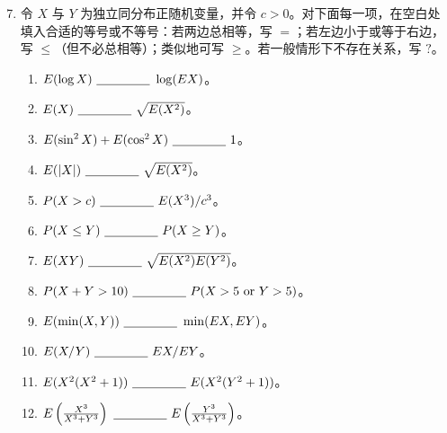 \documentclass[UTF8, 12pt, fontset=fandol, oneside]{ctexart}
\begin{document}
\begin{enumerate}
  \setcounter{enumi}{6}
  \item 令 $X$ 与 $Y$ 为独立同分布正随机变量，并令 $c>0$。对下面每一项，在空白处填入合适的等号或不等号：若两边总相等，写 $=$；若左边小于或等于右边，写 $\le$（但不必总相等）；类似地可写 $\ge$。若一般情形下不存在关系，写 $?$。
  \begin{enumerate}
    \item $E(\log X)\ \underline{\hspace{1.5cm}}\ \log(EX)$。
    \item $E(X)\ \underline{\hspace{1.5cm}}\ \sqrt{E(X^2)}$。
    \item $E(\sin^2 X)+E(\cos^2 X)\ \underline{\hspace{1.5cm}}\ 1$。
    \item $E(|X|)\ \underline{\hspace{1.5cm}}\ \sqrt{E(X^2)}$。
    \item $P(X>c)\ \underline{\hspace{1.5cm}}\ E(X^3)/c^3$。
    \item $P(X\le Y)\ \underline{\hspace{1.5cm}}\ P(X\ge Y)$。
    \item $E(XY)\ \underline{\hspace{1.5cm}}\ \sqrt{E(X^2)E(Y^2)}$。
    \item $P(X+Y>10)\ \underline{\hspace{1.5cm}}\ P(X>5\text{ or }Y>5)$。
    \item $E(\min(X,Y))\ \underline{\hspace{1.5cm}}\ \min(EX,EY)$。
    \item $E(X/Y)\ \underline{\hspace{1.5cm}}\ EX/EY$。
    \item $E(X^2(X^2+1))\ \underline{\hspace{1.5cm}}\ E(X^2(Y^2+1))$。
    \item $E\left(\frac{X^3}{X^3+Y^3}\right)\ \underline{\hspace{1.5cm}}\ E\left(\frac{Y^3}{X^3+Y^3}\right)$。
  \end{enumerate}


\end{enumerate}
\end{document}
